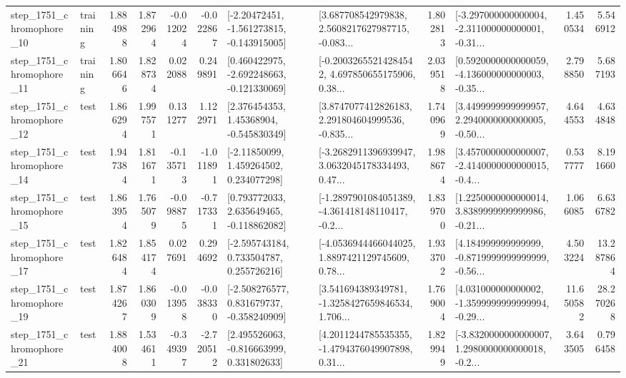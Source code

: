 \begin{tabular}{llrrrrllrlrr}
 step\_1751\_chromophore\_10 &  training &      1.884988 &    1.872964 &     -0.012024 & -0.022867 &   [-2.20472451, -1.561273815, -0.143915005] &  [3.687708542979838, 2.5608217627987715, -0.083... &       1.802813 &  [-3.297000000000004, -2.311000000000001, -0.31... &            1.450534 &          5.546912 \\
 step\_1751\_chromophore\_11 &  training &      1.806646 &    1.828734 &      0.022088 &  0.249891 &   [0.460422975, -2.692248663, -0.121330069] &  [-0.20032655214284542, 4.697850655175906, 0.38... &       2.039518 &  [0.5920000000000059, -4.136000000000003, -0.35... &            2.798850 &          5.687193 \\
 step\_1751\_chromophore\_12 &      test &      1.866294 &    1.997571 &      0.131277 &  1.122971 &     [2.376454353, 1.45368904, -0.545830349] &  [3.8747077412826183, 2.291804604999536, -0.835... &       1.740969 &  [3.4499999999999957, 2.2940000000000005, -0.50... &            4.644553 &          4.634848 \\
 step\_1751\_chromophore\_14 &      test &      1.947384 &    1.811671 &     -0.135713 & -1.011891 &     [-2.11850099, 1.459264502, 0.234077298] &  [-3.2682911396939947, 3.0632045178334493, 0.47... &       1.988674 &  [3.4570000000000007, -2.4140000000000015, -0.4... &            0.537777 &          8.191660 \\
 step\_1751\_chromophore\_15 &      test &      1.863954 &    1.765079 &     -0.098875 & -0.717331 &    [0.793772033, 2.635649465, -0.118862082] &  [-1.2897901084051389, -4.361418148110417, -0.2... &       1.839700 &  [1.2250000000000014, 3.8389999999999986, -0.21... &            1.066085 &          6.636782 \\
 step\_1751\_chromophore\_17 &      test &      1.826484 &    1.854174 &      0.027691 &  0.294692 &    [-2.595743184, 0.733504787, 0.255726216] &  [-4.0536944466044025, 1.8897421129745609, 0.78... &       1.933702 &  [4.184999999999999, -0.8719999999999999, -0.56... &            4.503224 &         13.287864 \\
 step\_1751\_chromophore\_19 &      test &      1.874267 &    1.860309 &     -0.013958 & -0.038330 &   [-2.508276577, 0.831679737, -0.358240909] &  [3.541694389349781, -1.3258427659846534, 1.706... &       1.769004 &  [4.031000000000002, -1.3599999999999994, -0.29... &           11.650582 &         28.270268 \\
 step\_1751\_chromophore\_21 &      test &      1.884008 &    1.534611 &     -0.349397 & -2.720512 &    [2.495526063, -0.816663999, 0.331802633] &  [4.2011244785535355, -1.4794376049907898, 0.31... &       1.829949 &  [-3.8320000000000007, 1.2980000000000018, -0.2... &            3.643505 &          0.796458 \\

\end{tabular}

